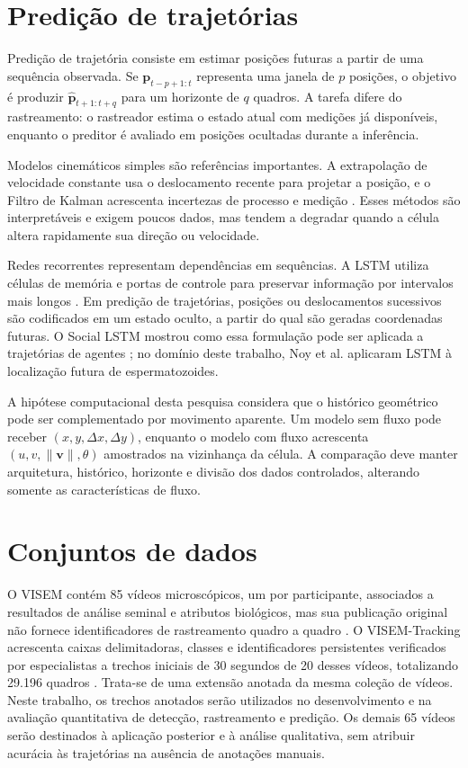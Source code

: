 \section{Predição de trajetórias}

Predição de trajetória consiste em estimar posições futuras a partir de uma sequência observada. Se $\mathbf{p}_{t-p+1:t}$ representa uma janela de $p$ posições, o objetivo é produzir $\widehat{\mathbf{p}}_{t+1:t+q}$ para um horizonte de $q$ quadros. A tarefa difere do rastreamento: o rastreador estima o estado atual com medições já disponíveis, enquanto o preditor é avaliado em posições ocultadas durante a inferência.

Modelos cinemáticos simples são referências importantes. A extrapolação de velocidade constante usa o deslocamento recente para projetar a posição, e o Filtro de Kalman acrescenta incertezas de processo e medição \cite{kalman1960filter}. Esses métodos são interpretáveis e exigem poucos dados, mas tendem a degradar quando a célula altera rapidamente sua direção ou velocidade.

Redes recorrentes representam dependências em sequências. A \ac{LSTM} utiliza células de memória e portas de controle para preservar informação por intervalos mais longos \cite{hochreiter1997lstm}. Em predição de trajetórias, posições ou deslocamentos sucessivos são codificados em um estado oculto, a partir do qual são geradas coordenadas futuras. O Social LSTM mostrou como essa formulação pode ser aplicada a trajetórias de agentes \cite{alahi2016sociallstm}; no domínio deste trabalho, Noy et al. \cite{noy2023location} aplicaram LSTM à localização futura de espermatozoides.

A hipótese computacional desta pesquisa considera que o histórico geométrico pode ser complementado por movimento aparente. Um modelo sem fluxo pode receber $(x,y,\Delta x,\Delta y)$, enquanto o modelo com fluxo acrescenta $(u,v,\lVert\mathbf{v}\rVert,\theta)$ amostrados na vizinhança da célula. A comparação deve manter arquitetura, histórico, horizonte e divisão dos dados controlados, alterando somente as características de fluxo.

\section{Conjuntos de dados}

O VISEM contém 85 vídeos microscópicos, um por participante, associados a resultados de análise seminal e atributos biológicos, mas sua publicação original não fornece identificadores de rastreamento quadro a quadro \cite{haugen2019visem}. O VISEM-Tracking acrescenta caixas delimitadoras, classes e identificadores persistentes verificados por especialistas a trechos iniciais de 30 segundos de 20 desses vídeos, totalizando 29.196 quadros \cite{thambawita2023visemtracking}. Trata-se de uma extensão anotada da mesma coleção de vídeos. Neste trabalho, os trechos anotados serão utilizados no desenvolvimento e na avaliação quantitativa de detecção, rastreamento e predição. Os demais 65 vídeos serão destinados à aplicação posterior e à análise qualitativa, sem atribuir acurácia às trajetórias na ausência de anotações manuais.

